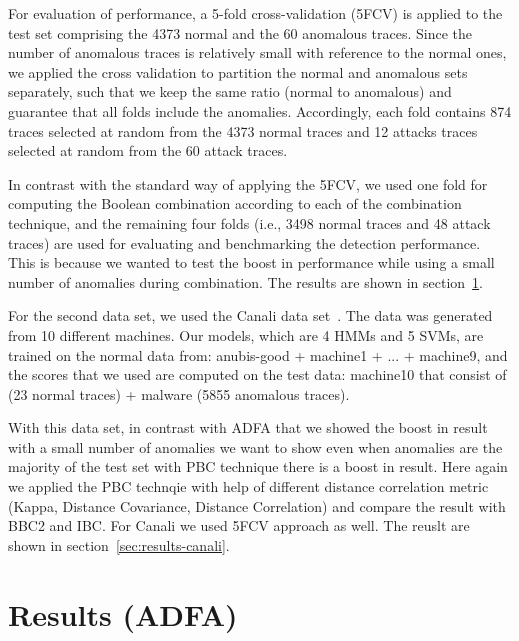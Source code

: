 For evaluation of performance, a 5-fold cross-validation (5FCV) is applied to the test set comprising the 4373 normal and the 60 anomalous traces.
Since the number of anomalous traces is relatively small with reference to the normal ones, we applied the cross validation to partition the normal and anomalous sets separately, such that we keep the same ratio (normal to anomalous) and guarantee that all folds include the anomalies.
Accordingly, each fold contains 874 traces selected at random from the 4373 normal traces and 12 attacks traces selected at random from the 60 attack traces.

In contrast with the standard way of applying the 5FCV, we used one fold for computing the Boolean combination according to each of the combination technique,
and the remaining four folds (i.e., 3498 normal traces and 48 attack traces) are used for evaluating and benchmarking the detection performance.
This is because we wanted to test the boost in performance while using a small number of anomalies during combination. The results are shown in section~\ref{sec:results-ADFA}.

For the second data set, we used the Canali data set~\cite{Canali2012}. The data was generated from 10 different machines. Our models, which are 4 HMMs and 5 SVMs, are trained on the normal data from: anubis-good + machine1 + ... + machine9, and the scores that we used are computed on the test data: machine10 that consist of (23 normal traces) + malware (5855 anomalous traces).

With this data set, in contrast with ADFA that we showed the boost in result with a small number of anomalies we want to show even when  anomalies are the majority of the test set with PBC technique there is a boost in result.
Here again we applied the PBC technqie with help of different distance correlation metric (Kappa, Distance Covariance, Distance Correlation) and compare the result with BBC2 and IBC. For Canali we used 5FCV approach as well. The reuslt are shown in section~\ref{sec:results-canali}.



\section{Results (ADFA)}
\label{sec:results-ADFA}



